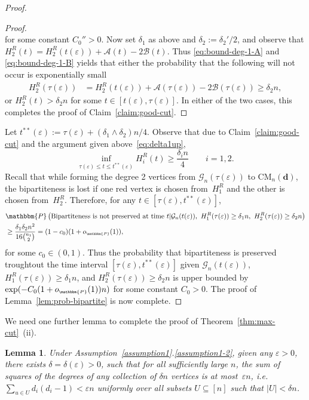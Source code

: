 \documentclass[11pt,a4paper, reqno]{article}
\numberwithin{equation}{section}
\numberwithin{equation}{section}
\def\sss{\scriptscriptstyle}
\newcommand{\prob}[1]{\ensuremath{\mathbbm{P}\left(#1\right)}}
\newcommand{\PR}{\ensuremath{\mathbbm{P}}}
\newcommand{\1}{\ensuremath{\mathbbm{1}}}
\newcommand{\oP}{\ensuremath{o_{\sss\PR}}}
\newcommand{\CM}{\ensuremath{\mathrm{CM}_n(\boldsymbol{d})}}
\newtheorem{lemma}[theorem]{Lemma}
\newenvironment{claimproof}{\begin{proof}\renewcommand{\qedsymbol}{\claimqed}}{\end{proof}\renewcommand{\qedsymbol}{\plainqed}}
\let\plainqed\qedsymbol
\newcommand{\claimqed}{$\lrcorner$}
\numberwithin{equation}{section}
\numberwithin{theorem}{section}
\begin{document}
\begin{proof}
\begin{claimproof}
\begin{equation}
\end{equation}
for some constant $C_0''>0$.
Now set $\delta_1$ as above and $\delta_2 := \delta_2'/2$, and observe that $H_2^R(t) = H_2^R(t(\varepsilon))+\mathcal{A}(t)-2\mathcal{B}(t)$. 
Thus \eqref{eq:bound-deg-1-A} and \eqref{eq:bound-deg-1-B} yields that either the probability that the following will not occur is exponentially small
\begin{align*}
H_2^R(\tau(\varepsilon)) &= H_2^R(t(\varepsilon))+\mathcal{A}(\tau(\varepsilon))-2\mathcal{B}(\tau(\varepsilon))\geq \delta_2 n,
\end{align*}
or $H_2^R(t)>\delta_2n$ for some $t\in[t(\varepsilon),  \tau(\varepsilon)]$.
In either of the two cases, this completes the proof of Claim~\ref{claim:good-cut}.
\end{claimproof}
\noindent
Let $t^{**}(\varepsilon):=\tau(\varepsilon)+(\delta_1\wedge\delta_2)n/4$.
Observe that due to Claim~\ref{claim:good-cut} and the argument given above~\eqref{eq:delta1up},
\begin{equation}
\inf_{\tau(\varepsilon)\leq t\leq t^{**}(\varepsilon)} H^R_i(t)\geq \frac{\delta_in}{4}\qquad i = 1,2.
\end{equation}
Recall that while forming the degree 2 vertices from $\mathcal{G}_n(\tau(\varepsilon))$ to $\CM$, the bipartiteness is lost if one red vertex is chosen from~$H_1^R$ and the other is chosen  from~$H_2^R$.
Therefore, for any $t\in[\tau(\varepsilon), t^{**}(\varepsilon)]$,
\begin{align*}
&\prob{\text{Bipartiteness is not preserved at time }t \vert \mathcal{G}_n(t(\varepsilon)),\ H_1^R(\tau(\varepsilon))\geq \delta_1n,\  H_2^R(\tau(\varepsilon))\geq \delta_2n}\\
&\geq \frac{\delta_1\delta_2n^2}{16{n_1 \choose 2}} = (1-c_0)(1+\oP(1)),
\end{align*}
for some $c_0\in (0,1)$.
Thus the probability that bipartiteness is preserved troughtout  the time interval $[\tau(\varepsilon), t^{**}(\varepsilon)]$ given $\mathcal{G}_n(t(\varepsilon))$, $H_1^R(\tau(\varepsilon))\geq \delta_1n$,  and $H_2^R(\tau(\varepsilon))\geq \delta_2n$ is upper bounded by $\exp(-C_0(1+\oP(1))n)$
for some constant $C_0>0$.
The proof of Lemma~\ref{lem:prob-bipartite} is now complete.
\end{proof}
We need one further lemma to complete the proof of Theorem~\ref{thm:max-cut}~(ii).
\begin{lemma}
\label{lem:small-sq-nbd} 
Under Assumption~\ref{assumption1}.\ref{assumption1-2}, given any $\varepsilon>0$, there exists $\delta = \delta(\varepsilon) >0$, such that for all sufficiently large $n$, the sum of squares of the degrees of \emph{any} collection of $\delta n$ vertices is at most~$\varepsilon n$, i.e. $\sum_{u\in U}d_i(d_i-1)<\varepsilon n$ uniformly over all subsets $U\subseteq [n]$ such that $|U|< \delta n$.
\end{lemma}
\end{document}
